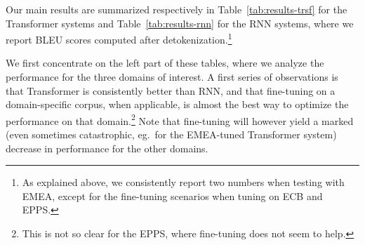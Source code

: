 \documentclass[11pt,a4paper]{article}
\newcommand{\fyTodo}[1]{\Todo[FY:]{\textcolor{orange}{#1}}}
\begin{document}

Our main results are summarized respectively in Table~\ref{tab:results-trsf} for the Transformer systems and Table~\ref{tab:results-rnn} for the RNN systems, where we report BLEU scores \cite{Papineni02bleu} computed after detokenization.\footnote{As explained above, we consistently report two numbers when testing with EMEA, except for the fine-tuning scenarios when tuning on ECB and EPPS.} %

We first concentrate on the left part of these tables, where we analyze the performance for the three domains of interest. A first series of observations is that Transformer is consistently better than RNN, and that fine-tuning on a domain-specific corpus, when applicable, is almost the best way to optimize the performance on that domain.\footnote{This is not so clear for the EPPS, where fine-tuning does not seem to help.}  Note that fine-tuning will however yield a marked (even sometimes catastrophic, eg.\ for the EMEA-tuned Transformer system) decrease in performance for the other domains. 
\end{document}
